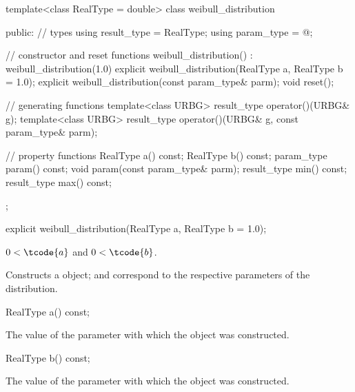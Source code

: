 %
\begin{codeblock}
template<class RealType = double>
  class weibull_distribution {
  public:
    // types
    using result_type = RealType;
    using param_type  = @\unspec@;

    // constructor and reset functions
    weibull_distribution() : weibull_distribution(1.0) {}
    explicit weibull_distribution(RealType a, RealType b = 1.0);
    explicit weibull_distribution(const param_type& parm);
    void reset();

    // generating functions
    template<class URBG>
      result_type operator()(URBG& g);
    template<class URBG>
      result_type operator()(URBG& g, const param_type& parm);

    // property functions
    RealType a() const;
    RealType b() const;
    param_type param() const;
    void param(const param_type& parm);
    result_type min() const;
    result_type max() const;
  };
\end{codeblock}

%
\begin{itemdecl}
explicit weibull_distribution(RealType a, RealType b = 1.0);
\end{itemdecl}%

\begin{itemdescr}
\pnum
\requires $0 < \tcode{a}$ and $0 < \tcode{b}$.

\pnum
\effects Constructs a  object;
 and 
correspond to the respective parameters of the distribution.
\end{itemdescr}

%
\begin{itemdecl}
RealType a() const;
\end{itemdecl}

\begin{itemdescr}
\pnum\returns The value of the  parameter
 with which the object was constructed.
\end{itemdescr}

%
\begin{itemdecl}
RealType b() const;
\end{itemdecl}

\begin{itemdescr}
\pnum\returns The value of the  parameter
 with which the object was constructed.
\end{itemdescr}

